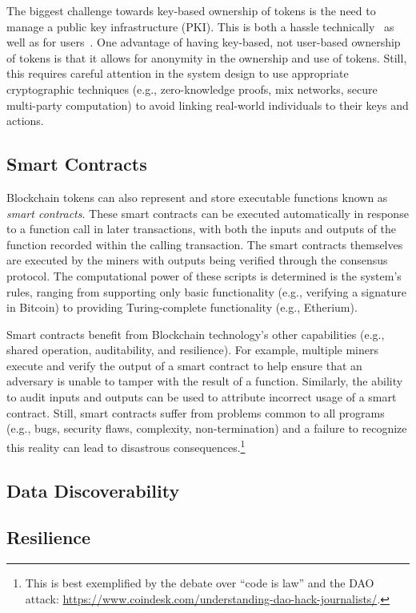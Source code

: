 The biggest challenge towards key-based ownership of tokens is the need to manage a public key infrastructure (PKI).
This is both a hassle technically~\cite{CT} as well as for users~\cite{ruoti2015johnny,barber2012bitter}.
One advantage of having key-based, not user-based ownership of tokens is that it allows for anonymity in the ownership and use of tokens.
Still, this requires careful attention in the system design to use appropriate cryptographic techniques (e.g., zero-knowledge proofs, mix networks, secure multi-party computation) to avoid linking real-world individuals to their keys and actions.

\subsection{Smart Contracts}
Blockchain tokens can also represent and store executable functions known as \emph{smart contracts}.
These smart contracts can be executed automatically in response to a function call in later transactions, with both the inputs and outputs of the function recorded within the calling transaction.
The smart contracts themselves are executed by the miners with outputs being verified through the consensus protocol.
The computational power of these scripts is determined is the system's rules, ranging from supporting only basic functionality (e.g., verifying a signature in Bitcoin) to providing Turing-complete functionality (e.g., Etherium).

Smart contracts benefit from Blockchain technology's other capabilities (e.g., shared operation, auditability, and resilience).
For example, multiple miners execute and verify the output of a smart contract to help ensure that an adversary is unable to tamper with the result of a function.
Similarly, the ability to audit inputs and outputs can be used to attribute incorrect usage of a smart contract.
Still, smart contracts suffer from problems common to all programs (e.g., bugs, security flaws, complexity, non-termination) and a failure to recognize this reality can lead to disastrous consequences.\footnote{This is best exemplified by the debate over ``code is law'' and the DAO attack: \url{https://www.coindesk.com/understanding-dao-hack-journalists/}.}

\subsection{Data Discoverability}

\subsection{Resilience}

